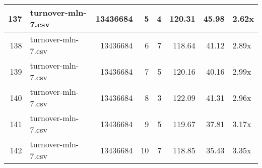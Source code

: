 \begin{table}[ht]
\begin{tabular}{rlrrrrrl}
   \hline
137 & turnover-mln-7.csv & 13436684 &   5 &   4 & 120.31 & 45.98 & 2.62x \\ 
   \hline
138 & turnover-mln-7.csv & 13436684 &   6 &   7 & 118.64 & 41.12 & 2.89x \\ 
   \hline
139 & turnover-mln-7.csv & 13436684 &   7 &   5 & 120.16 & 40.16 & 2.99x \\ 
   \hline
140 & turnover-mln-7.csv & 13436684 &   8 &   3 & 122.09 & 41.31 & 2.96x \\ 
   \hline
141 & turnover-mln-7.csv & 13436684 &   9 &   5 & 119.67 & 37.81 & 3.17x \\ 
   \hline
142 & turnover-mln-7.csv & 13436684 &  10 &   7 & 118.85 & 35.43 & 3.35x \\ 
   \hline
\end{tabular}
\end{table}

